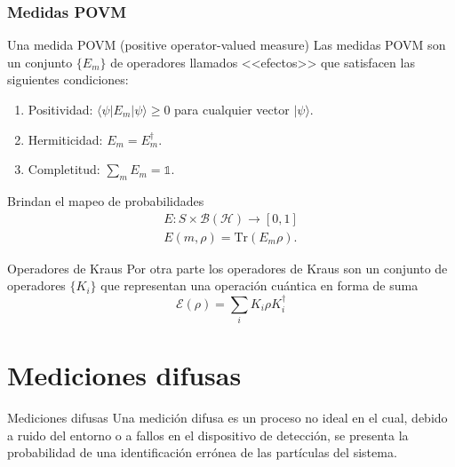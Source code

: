 \documentclass[svgnames,12pt,aspectratio=149]{beamer}
\newcommand{\E}{\mathcal{E}}
\begin{document}
\begin{frame}
\frametitle{Medidas POVM}
    \begin{block}{}
      Una medida POVM (positive operator-valued measure) 
Las medidas POVM son  un conjunto $\{E_{m}\}$ de operadores llamados <<efectos>> que satisfacen las siguientes condiciones:
\begin{enumerate}
    \item Positividad: $\langle \psi |E_m|\psi \rangle \ge 0 $ para cualquier vector $|\psi\rangle$.
    \item Hermiticidad: $E_m=E_{m}^\dagger$.
    \item  Completitud: $\sum_m E_m =\mathds{1}$.
\end{enumerate}
    \end{block}
  Brindan el mapeo de probabilidades \begin{equation*}\begin{split}
      E:S\times \mathcal{B(H)}\longrightarrow [0,1]\\
      E(m,\rho)=\text{Tr}(E_m\rho).
  \end{split}\end{equation*}


\end{frame}

\begin{frame}{Operadores de Kraus}
  Por otra parte los operadores de Kraus son un conjunto de operadores $\{K_i\} $ que representan una operación cuántica en forma de suma \begin{equation*}
    \E(\rho)=\sum_i K_i\rho K_i^\dagger \end{equation*}
\end{frame}







\section{Mediciones difusas}

\begin{frame}{Mediciones difusas}
Una medición difusa es un proceso no ideal en el cual, debido a ruido
del entorno o a fallos en el dispositivo de detección, se presenta la probabilidad de una
identificación errónea de las partículas del sistema.

\end{frame}
\end{document}
